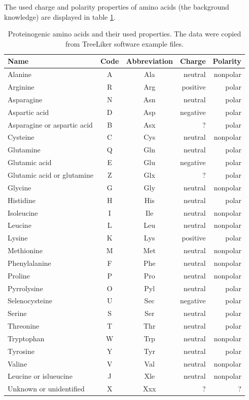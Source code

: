 \documentclass[11pt,twoside,a4paper]{book}
\begin{document}
The used charge and polarity properties of amino acids (the background knowledge) are displayed in table \ref{tab:aaprops}.
\begin{table}
\begin{center}
 \begin{tabular}{lccrr}
\textbf{Name} & \textbf{Code} & \textbf{Abbreviation} & \textbf{Charge} & \textbf{Polarity} \\
\hline
Alanine & A & Ala & neutral & nonpolar  \\ \hline
Arginine & R & Arg & positive & polar  \\ \hline
Asparagine & N & Asn & neutral & polar \\ \hline 
Aspartic acid & D & Asp & negative & polar  \\ \hline
Asparagine or aspartic acid & B & Asx & ? & polar \\ \hline 
Cysteine & C & Cys & neutral & nonpolar  \\ \hline
Glutamine & Q & Gln & neutral & polar  \\ \hline
Glutamic acid & E & Glu & negative & polar \\ \hline
Glutamic acid or glutamine & Z & Glx & ? & polar \\ \hline
Glycine & G & Gly & neutral & nonpolar \\ \hline
Histidine & H & His & neutral & polar \\ \hline
Isoleucine & I & Ile & neutral & nonpolar \\ \hline
Leucine & L & Leu & neutral & nonpolar \\ \hline
Lysine & K & Lys & positive & polar \\ \hline
Methionine & M & Met & neutral & nonpolar  \\ \hline
Phenylalanine & F & Phe & neutral & nonpolar  \\ \hline
Proline & P & Pro & neutral & nonpolar \\ \hline
Pyrrolysine & O & Pyl  & neutral & polar  \\ \hline
Selenocysteine & U & Sec & negative & polar  \\ \hline
Serine & S & Ser & neutral & polar  \\ \hline
Threonine & T & Thr & neutral & polar \\ \hline
Tryptophan & W & Trp & neutral & nonpolar   \\ \hline
Tyrosine & Y & Tyr & neutral & polar  \\ \hline
Valine & V & Val & neutral & nonpolar \\ \hline
Leucine or islueucine & J & Xle & neutral & nonpolar \\ \hline
Unknown or unidentified & X & Xxx & ? & ? \\ \hline
\end{tabular}
\caption[Proteinogenic amino acids and their used properties]{Proteinogenic amino acids and their used properties.
The data were copied from TreeLiker software example files.}
\label{tab:aaprops}
\end{center}
\end{table}
\end{document}
